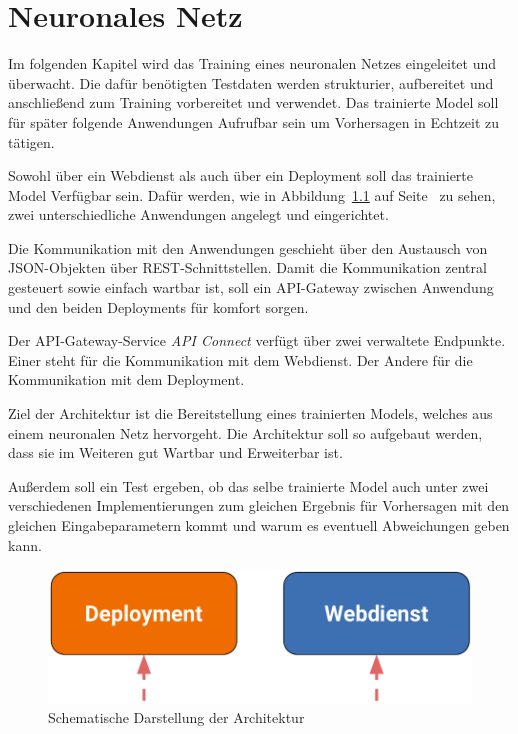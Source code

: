 \chapter{Neuronales Netz}
\label{ch:neuronalesNetz}
Im folgenden Kapitel wird das Training eines neuronalen Netzes eingeleitet und überwacht. Die dafür benötigten Testdaten 
werden strukturier, aufbereitet und anschließend zum Training vorbereitet und verwendet. Das trainierte Model soll für später
folgende Anwendungen Aufrufbar sein um Vorhersagen in Echtzeit zu tätigen.

Sowohl über ein Webdienst als auch über ein Deployment soll das trainierte Model Verfügbar sein. Dafür werden, wie in 
Abbildung~\ref{fig:schematische_architektur} auf Seite~\pageref{fig:schematische_architektur} zu sehen, zwei unterschiedliche
Anwendungen angelegt und eingerichtet.

Die Kommunikation mit den Anwendungen geschieht über den Austausch von JSON-Objekten über REST-Schnittstellen. Damit die 
Kommunikation zentral gesteuert sowie einfach wartbar ist, soll ein API-Gateway zwischen Anwendung und den beiden Deployments
für komfort sorgen.  

Der API-Gateway-Service \textit{API Connect} verfügt über zwei verwaltete Endpunkte. Einer steht für die Kommunikation
mit dem Webdienst. Der Andere für die Kommunikation mit dem Deployment.

Ziel der Architektur ist die Bereitstellung eines trainierten Models, welches aus einem neuronalen Netz hervorgeht. Die 
Architektur soll so aufgebaut werden, dass sie im Weiteren gut Wartbar und Erweiterbar ist.

Außerdem soll ein Test ergeben, ob das selbe trainierte Model auch unter zwei verschiedenen Implementierungen zum gleichen 
Ergebnis für Vorhersagen mit den gleichen Eingabeparametern kommt und warum es eventuell Abweichungen geben kann.

\begin{figure}[h]
    \centering
    \includegraphics[scale=0.5]{images/kapitel_3/architektur_schematisch.pdf}
    \caption{Schematische Darstellung der Architektur}
    \label{fig:schematische_architektur}
\end{figure}